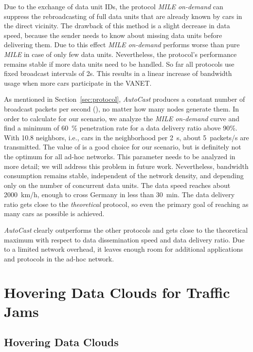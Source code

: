 \documentclass{acmrip}
\newcommand{\secref}[1]{Section~\ref{sec:#1}}
\newcommand{\AutoCast}[0]{{\em AutoCast} }
\begin{document}
Due to the exchange of data unit IDs, the protocol \textit{MILE
on-demand} can suppress the rebroadcasting of full data units that
are already known by cars in the direct vicinity. The drawback of
this method is a slight decrease in data speed, because the sender
needs to know about missing data units before delivering them. Due
to this effect \textit{MILE on-demand} performs worse than pure
\textit{MILE} in case of only few data units. Nevertheless, the
protocol's performance remains stable if more data units need to be
handled. So far all protocols use fixed broadcast intervals of 2s.
This results in a linear increase of bandwidth usage when
 more cars participate in the VANET.

\label{sec:results_autocast}

As mentioned in \secref{protocol}, \textit{AutoCast} produces a
constant number of broadcast packets per second
(), no matter how many nodes generate them. In
order to calculate  for our scenario, we analyze
the \textit{MILE on-demand} curve and find a minimum of 60~\%
penetration rate for a data delivery ratio above 90\%. With 10.8
neighbors, i.e.,  cars in the neighborhood
per 2~s, about 5~packets/s are transmitted. The value of
 is a good choice for our scenario, but is
definitely not the optimum for all ad-hoc networks. This parameter
needs to be analyzed in more detail; we will address this problem in
future work. Nevertheless, bandwidth consumption remains stable,
independent of the network density, and depending only on the number
of concurrent data units. The data speed reaches about 2000~km/h,
enough to cross Germany in less than 30~min. The data delivery ratio
gets close to the \textit{theoretical} protocol, so even the primary
goal of reaching as many cars as possible is achieved.

\AutoCast clearly outperforms the other protocols and gets close to
the theoretical maximum with respect to data dissemination speed and
data delivery ratio. Due to a limited network overhead, it leaves
enough room for additional applications and protocols in the ad-hoc
network.

\section{Hovering Data Clouds for Traffic Jams}
\subsection{Hovering Data Clouds}
\end{document}
